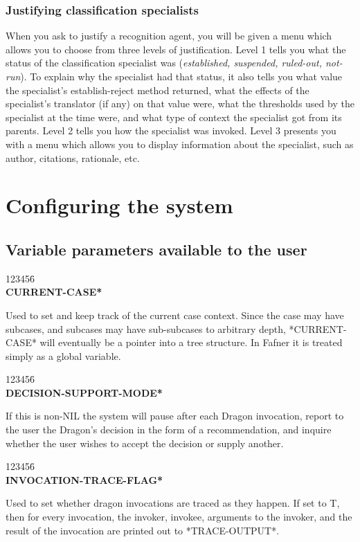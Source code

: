 \subsection{Justifying classification specialists}
When you ask to justify a recognition agent, you will be given a menu
which allows you to choose from three levels of justification.
Level 1 tells you what the status of the classification specialist
was ({\it established, suspended, ruled-out, not-run\/}). To explain
why the specialist had that status, it also tells you what value
the specialist's establish-reject method returned, what the effects
of the specialist's translator (if any) on that value were, what the
thresholds used by the specialist at the time were, and what type
of context the specialist got from its parents. Level 2 tells you
how the specialist was invoked. Level 3 presents you with a menu
which allows you to display information about the specialist, such as
author, citations, rationale, etc.



\chapter{Configuring the system}
\section{Variable parameters available to the user}

\begin{tabbing}
123456\= \kill
\\
{\bf *CURRENT-CASE*}
\end{tabbing}
Used to set and keep track of the current case context.  Since the
case may have subcases, and subcases may have sub-subcases to
arbitrary depth, *CURRENT-CASE* will eventually be a pointer into a
tree structure.  In Fafner it is treated simply as a global variable.

\begin{tabbing}
123456\= \kill
\\
{\bf *DECISION-SUPPORT-MODE*}
\end{tabbing}
If this is non-NIL the system will pause after each Dragon invocation,
report to the user the Dragon's decision in the form of a
recommendation, and inquire whether the user wishes to accept the
decision or supply another.

\begin{tabbing}
123456\= \kill
\\
{\bf *INVOCATION-TRACE-FLAG*}
\end{tabbing}
Used to set whether dragon invocations are traced as they happen.  If
set to T, then for every invocation, the invoker, invokee, arguments
to the invoker, and the result of the invocation are printed out to
*TRACE-OUTPUT*.

